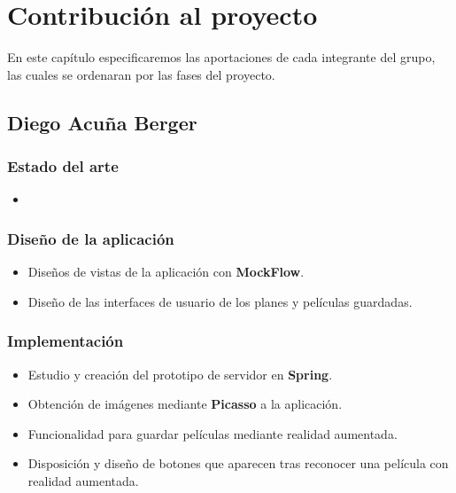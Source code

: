 
\cleardoublepage


\chapter{Contribución al proyecto}
\label{makereference7}
En este capítulo especificaremos las aportaciones de cada integrante del grupo,
 las cuales se ordenaran por las fases del proyecto.

\section{Diego Acuña Berger}
\label{makereference7.1}
    \subsection{Estado del arte}
    \label{makereference7.1.1}
        \begin{itemize}
            \item
        \end{itemize}
    \subsection{Diseño de la aplicación}
    \label{makereference7.1.2}
        \begin{itemize}
            \item Diseños de vistas de la aplicación con \textbf{MockFlow}.
            \item Diseño de las interfaces de usuario de los planes y películas
            guardadas.
        \end{itemize}
    \subsection{Implementación}
    \label{makereference7.1.3}
        \begin{itemize}
            \item Estudio y creación del prototipo de servidor en \textbf{Spring}.
            \item Obtención de imágenes mediante \textbf{Picasso} a la aplicación.
            \item Funcionalidad para guardar películas mediante realidad aumentada.
            \item Disposición y diseño de botones que aparecen tras reconocer una
            película con realidad aumentada.
        \end{itemize}
